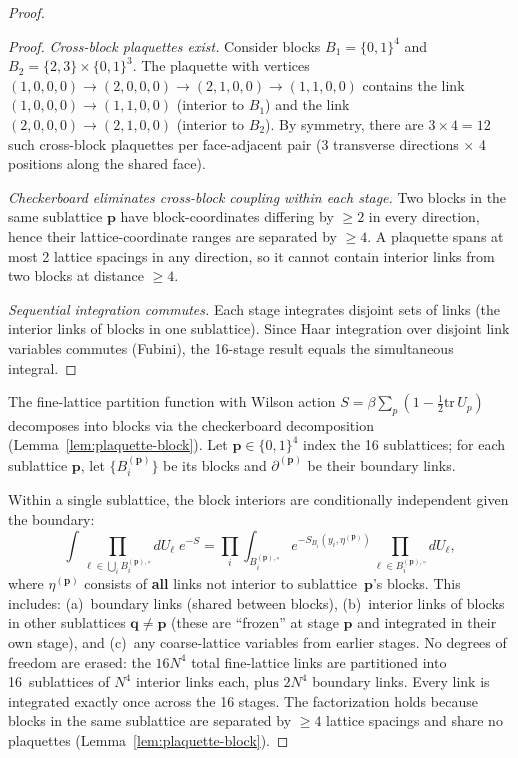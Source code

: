 \documentclass[11pt]{article}
\theoremstyle{definition}
\newcommand{\tr}{\mathrm{tr}}
\begin{document}
\begin{proof}
\begin{proof}
\emph{Cross-block plaquettes exist.}
Consider blocks $B_1=\{0,1\}^4$ and $B_2=\{2,3\}\times\{0,1\}^3$.
The plaquette with vertices
$(1,0,0,0)\to(2,0,0,0)\to(2,1,0,0)\to(1,1,0,0)$
contains the link $(1,0,0,0)\to(1,1,0,0)$ (interior to $B_1$)
and the link $(2,0,0,0)\to(2,1,0,0)$ (interior to $B_2$).
By symmetry, there are $3\times 4=12$ such cross-block plaquettes
per face-adjacent pair (3 transverse directions $\times$
4 positions along the shared face).

\emph{Checkerboard eliminates cross-block coupling within each stage.}
Two blocks in the same sublattice $\mathbf{p}$ have
block-coordinates differing by $\ge 2$ in every direction,
hence their lattice-coordinate ranges are separated by $\ge 4$.
A plaquette spans at most 2 lattice spacings in any direction,
so it cannot contain interior links from two blocks at
distance $\ge 4$.

\emph{Sequential integration commutes.}
Each stage integrates disjoint sets of links
(the interior links of blocks in one sublattice).
Since Haar integration over disjoint link variables commutes
(Fubini), the 16-stage result equals the simultaneous integral.
\end{proof}

The fine-lattice partition function with Wilson action
$S=\beta\sum_p(1-\frac{1}{2}\tr\,U_p)$ decomposes into blocks
via the checkerboard decomposition
(Lemma~\ref{lem:plaquette-block}).
Let $\mathbf{p}\in\{0,1\}^4$ index the 16 sublattices;
for each sublattice $\mathbf{p}$, let
$\{B_i^{(\mathbf{p})}\}$ be its blocks and
$\partial^{(\mathbf{p})}$ be their boundary links.

Within a single sublattice, the block interiors are
conditionally independent given the boundary:
\begin{equation}\label{eq:block-factor}
\int\prod_{\ell\in\bigcup_i B_i^{(\mathbf{p}),\circ}}dU_\ell\;
e^{-S}
=\prod_i\int_{B_i^{(\mathbf{p}),\circ}}
e^{-S_{B_i}(y_i,\eta^{(\mathbf{p})})}
\prod_{\ell\in B_i^{(\mathbf{p}),\circ}}dU_\ell,
\end{equation}
where $\eta^{(\mathbf{p})}$ consists of \textbf{all} links
not interior to sublattice~$\mathbf{p}$'s blocks.
This includes: (a)~boundary links (shared between blocks),
(b)~interior links of blocks in other sublattices
$\mathbf{q}\ne\mathbf{p}$ (these are ``frozen'' at stage
$\mathbf{p}$ and integrated in their own stage), and
(c)~any coarse-lattice variables from earlier stages.
No degrees of freedom are erased:
the $16N^4$ total fine-lattice links are partitioned into
16~sublattices of $N^4$ interior links each, plus
$2N^4$ boundary links.  Every link is integrated exactly
once across the 16 stages.
The factorization holds because blocks in the same
sublattice are separated by $\ge 4$ lattice spacings
and share no plaquettes
(Lemma~\ref{lem:plaquette-block}).


\end{proof}
\end{document}
